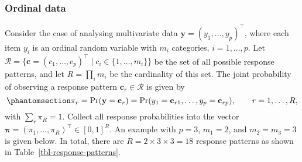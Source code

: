 \documentclass[
  letterpaper,
  DIV=11,
  numbers=noendperiod]{scrartcl}
\author{}
\date{}
\begin{document}
\subsubsection{Ordinal data}\label{ordinal-data}

Consider the case of analysing multivariate data
\(\mathbf y = (y_{1}, \ldots, y_{p})^\top\), where each item \(y_{i}\)
is an ordinal random variable with \(m_i\) categories, \(i=1,\dots,p\).
Let
\(\mathcal R = \{ \mathbf c = (c_1,\dots, c_p)^\top \mid c_i \in \{1,\dots, m_i\}\}\)
be the set of all possible response patterns, and let
\(R=\prod_{i} m_i\) be the cardinality of this set. The joint
probability of observing a response pattern
\(\mathbf c_r \in \mathcal R\) is given by
\begin{equation}\phantomsection\label{eq-each-joint-resp-prob}{
\pi_r = \Pr(\mathbf y = \mathbf c_r) = \Pr(y_1 = \mathbf c_{r1}, \ldots, y_p = \mathbf c_{rp}), \hspace{2em} r = 1, \ldots, R,
}\end{equation} with \(\sum_r \pi_R = 1\). Collect all response
probabilities into the vector
\(\boldsymbol \pi = (\pi_1, \ldots, \pi_R)^\top \in [0,1]^R\). An
example with \(p=3\), \(m_1=2\), and \(m_2=m_3=3\) is given below. In
total, there are \(R=2 \times 3 \times 3 = 18\) response patterns as
shown in Table~\ref{tbl-response-patterns}.
\end{document}
